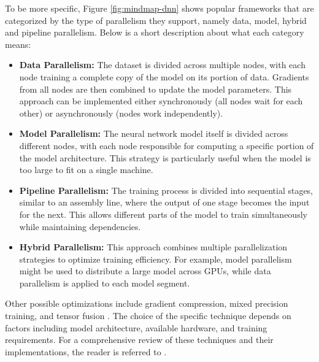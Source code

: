 To be more specific, Figure \ref{fig:mindmap-dnn} shows popular frameworks that are categorized by
the type of parallelism they support, namely data, model, hybrid and pipeline parallelism. Below is
a short description about what each category means:



\begin{itemize}
	\item \textbf{Data Parallelism:}
	      The dataset is divided across multiple nodes, with each node training a complete copy of the
	      model on its portion of data. Gradients from all nodes are then combined to update the model parameters.
	      This approach can be implemented either synchronously (all nodes wait for each other) or asynchronously (nodes work independently).

	\item \textbf{Model Parallelism:}
	      The neural network model itself is divided across different nodes, with each node responsible
	      for computing a specific portion of the model architecture. This strategy is particularly useful
	      when the model is too large to fit on a single machine.

	\item \textbf{Pipeline Parallelism:}
	      The training process is divided into sequential stages, similar to an assembly line,
	      where the output of one stage becomes the input for the next. This allows different parts
	      of the model to train simultaneously while maintaining dependencies.

	\item \textbf{Hybrid Parallelism:}
	      This approach combines multiple parallelization strategies to optimize training efficiency.
	      For example, model parallelism might be used to distribute a large model across GPUs, while
	      data parallelism is applied to each model segment.
\end{itemize}

Other possible optimizations include gradient compression, mixed precision training, and tensor
fusion \cite{dehghani_distributed_2023}. The choice of the specific technique depends on factors
including model architecture, available hardware, and training requirements. For a comprehensive
review of these techniques and their implementations, the reader is referred to
\cite{chahal_hitchhikers_2018}.

%
%

